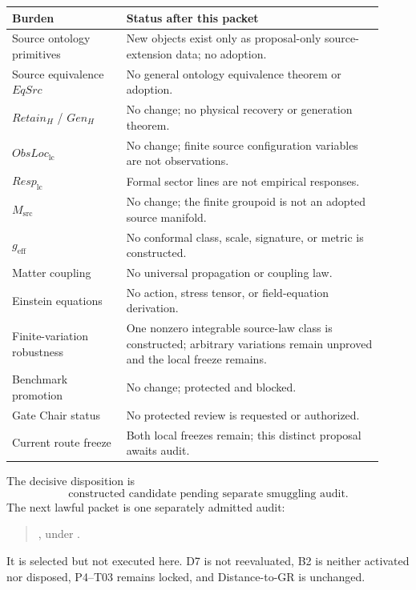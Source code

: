 \documentclass[11pt]{article}
\begin{document}
\begin{longtable}{p{0.29\linewidth}p{0.63\linewidth}}
\toprule
Burden & Status after this packet\\
\midrule
\endhead
Source ontology primitives & New objects exist only as proposal-only source-extension data; no adoption.\\
Source equivalence $EqSrc$ & No general ontology equivalence theorem or adoption.\\
$Retain_H$ / $Gen_H$ & No change; no physical recovery or generation theorem.\\
$ObsLoc_{\mathrm{lc}}$ & No change; finite source configuration variables are not observations.\\
$Resp_{\mathrm{lc}}$ & Formal sector lines are not empirical responses.\\
$M_{\mathrm{src}}$ & No change; the finite groupoid is not an adopted source manifold.\\
$g_{\mathrm{eff}}$ & No conformal class, scale, signature, or metric is constructed.\\
Matter coupling & No universal propagation or coupling law.\\
Einstein equations & No action, stress tensor, or field-equation derivation.\\
Finite-variation robustness & One nonzero integrable source-law class is constructed; arbitrary variations remain unproved and the local freeze remains.\\
Benchmark promotion & No change; protected and blocked.\\
Gate Chair status & No protected review is requested or authorized.\\
Current route freeze & Both local freezes remain; this distinct proposal awaits audit.\\
\bottomrule
\end{longtable}

The decisive disposition is
\[
\boxed{\text{constructed candidate pending separate smuggling audit}.}
\]
The next lawful packet is one separately admitted audit:
\begin{quote}
\small{}, under
.
\end{quote}
It is selected but not executed here.  D7 is
not reevaluated, B2 is neither activated nor disposed, P4--T03 remains locked,
and Distance-to-GR is unchanged.
\end{document}
